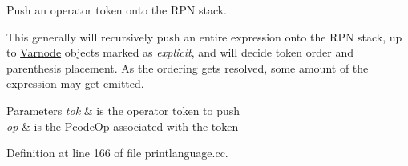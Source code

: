 Push an operator token onto the R\+PN stack. 

This generally will recursively push an entire expression onto the R\+PN stack, up to \mbox{\hyperlink{class_varnode}{Varnode}} objects marked as {\itshape explicit}, and will decide token order and parenthesis placement. As the ordering gets resolved, some amount of the expression may get emitted. 
\begin{DoxyParams}{Parameters}
{\em tok} & is the operator token to push \\
\hline
{\em op} & is the \mbox{\hyperlink{class_pcode_op}{Pcode\+Op}} associated with the token \\
\hline
\end{DoxyParams}


Definition at line 166 of file printlanguage.\+cc.

